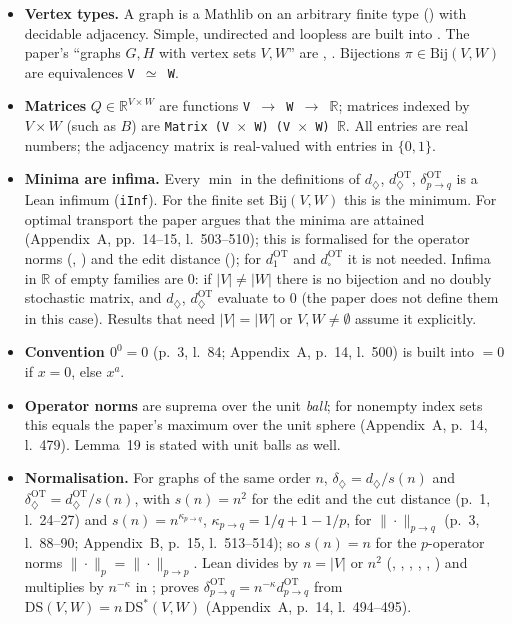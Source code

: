 \begin{itemize}
\item \textbf{Vertex types.} A graph is a Mathlib  on an arbitrary finite type 
  (\lean{[Fintype V] [DecidableEq V]}) with decidable adjacency. Simple, undirected and loopless are built into
  . The paper's ``graphs $G,H$ with vertex sets $V,W$'' are ,
  . Bijections $\pi\in\mathrm{Bij}(V,W)$ are equivalences \texttt{V $\simeq$ W}.
\item \textbf{Matrices} $Q\in\mathbb R^{V\times W}$ are functions \texttt{V $\to$ W $\to$ $\mathbb{R}$}; matrices indexed by
  $V\times W$ (such as $B$) are \texttt{Matrix (V $\times$ W) (V $\times$ W) $\mathbb{R}$}. All entries are real numbers; the adjacency
  matrix is real-valued with entries in $\{0,1\}$.
\item \textbf{Minima are infima.} Every $\min$ in the definitions of $d_\diamondsuit$, $d^{\mathrm{OT}}_\diamondsuit$,
  $\delta^{\mathrm{OT}}_{p\to q}$ is a Lean infimum (\texttt{iInf}). For the finite set $\mathrm{Bij}(V,W)$ this is the minimum.
  For optimal transport the paper argues that the minima are attained (Appendix~A, pp.~14--15, l.~503--510); this is
  formalised for the operator norms (, ) and the edit distance
  (); for $d^{\mathrm{OT}}_1$ and $d^{\mathrm{OT}}_\square$ it is not needed. Infima in
  $\mathbb{R}$ of empty families are $0$: if $|V|\neq|W|$ there is no bijection and no doubly stochastic matrix, and
  $d_\diamondsuit$, $d^{\mathrm{OT}}_\diamondsuit$ evaluate to $0$ (the paper does not define them in this case).
  Results that need $|V|=|W|$ or $V,W\neq\emptyset$ assume it explicitly.
\item \textbf{Convention $0^0=0$} (p.~3, l.~84; Appendix~A, p.~14, l.~500) is built into  $=0$ if $x=0$, else $x^a$.
\item \textbf{Operator norms} are suprema over the unit \emph{ball}; for nonempty index sets this equals the
  paper's maximum over the unit sphere (Appendix~A, p.~14, l.~479). Lemma~19 is stated with unit balls as well.
\item \textbf{Normalisation.} For graphs of the same order $n$, $\delta_\diamondsuit=d_\diamondsuit/s(n)$ and
  $\delta^{\mathrm{OT}}_\diamondsuit=d^{\mathrm{OT}}_\diamondsuit/s(n)$, with $s(n)=n^2$ for the edit and the cut distance
  (p.~1, l.~24--27) and $s(n)=n^{\kappa_{p\to q}}$, $\kappa_{p\to q}=1/q+1-1/p$, for $\|\cdot\|_{p\to q}$
  (p.~3, l.~88--90; Appendix~B, p.~15, l.~513--514); so $s(n)=n$ for the $p$-operator norms $\|\cdot\|_p=\|\cdot\|_{p\to p}$.
  Lean divides by $n=|V|$ or $n^2$ (, , , ,
  , ) and multiplies by $n^{-\kappa}$ in ;  proves
  $\delta^{\mathrm{OT}}_{p\to q}=n^{-\kappa}d^{\mathrm{OT}}_{p\to q}$ from $\mathrm{DS}(V,W)=n\,\mathrm{DS}^*(V,W)$ (Appendix~A, p.~14, l.~494--495).
\end{itemize}

